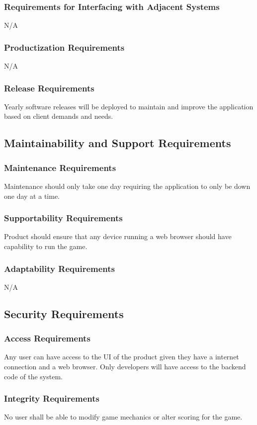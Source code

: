 \documentclass[12pt, titlepage]{article}
\begin{document}
\subsubsection{Requirements for Interfacing with Adjacent Systems}
N/A
\subsubsection{Productization Requirements}
N/A
\subsubsection{Release Requirements}
Yearly software releases will be deployed to maintain and improve the application based on client demands and needs.

\subsection{Maintainability and Support Requirements}
\subsubsection{Maintenance Requirements}
Maintenance should only take one day requiring the application to only be down one day at a time.
\subsubsection{Supportability Requirements}
Product should ensure that any device running a web browser should have capability to run the game.
\subsubsection{Adaptability Requirements}
N/A

\subsection{Security Requirements}
\subsubsection{Access Requirements}
Any user can have access to the UI of the product given they have a internet connection and a web browser. Only developers will have access to the backend code of the system.
\subsubsection{Integrity Requirements}
No user shall be able to modify game mechanics or alter scoring for the game.
\end{document}
